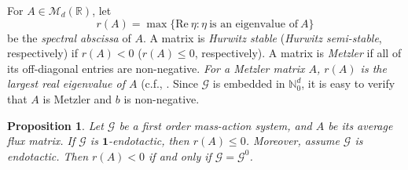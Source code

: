 \documentclass[10pt]{amsart}
\numberwithin{equation}{section}
\theoremstyle{plain}
\newtheorem{proposition}[theorem]{Proposition}
\theoremstyle{definition}
\theoremstyle{remark}
\newcommand{\cG}{\mathcal{G}}
\begin{document}
For $A\in\mathcal{M}_d(\mathbb{R})$, let
\[r(A)=\max\{\textrm{Re}\ \eta\colon \eta\ \text{is an eigenvalue of}\ A\}\]
be the \emph{spectral  abscissa} of $A$.
A matrix is \emph{Hurwitz stable} (\emph{Hurwitz semi-stable}, respectively) if $r(A)<0$ ($r(A)\le0$, respectively). A matrix is \emph{Metzler} if all of its off-diagonal entries are non-negative. \emph{For a Metzler matrix $A$, $r(A)$ is the largest real eigenvalue of $A$} (c.f., \cite[8.3.P9]{HJ13}. Since $\cG$ is embedded in $\mathbb{N}^d_0$,  it is easy to verify that $A$ is Metzler and $b$ is non-negative. 

\begin{proposition}\label{prop:endotactic-Hurwitz}
Let $\cG$ be a first order mass-action system, and $A$  be its  average flux matrix. If $\cG$ is $\mathbf{1}$-endotactic, then $r(A)\le0$. Moreover, assume $\cG$ is endotactic.  Then
$r(A)<0$ if and only if $\cG=\cG^0$.
\end{proposition}
\end{document}
